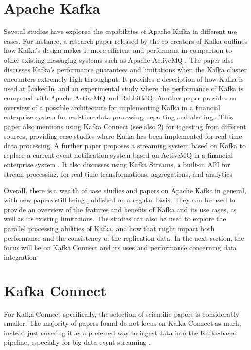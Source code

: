 \section{Apache Kafka}
Several studies have explored the capabilities of Apache Kafka in different use cases. For instance, a research paper released by the co-creators of Kafka outlines how Kafka's design makes it more efficient and performant in comparison to other existing messaging systems such as Apache ActiveMQ \cite{kreps2011kafka}. The paper also discusses Kafka's performance guarantees and limitations when the Kafka cluster encounters extremely high throughput. It provides a description of how Kafka is used at LinkedIn, and an experimental study where the performance of Kafka is compared with Apache ActiveMQ and RabbitMQ. Another paper provides an overview of a possible architecture for implementing Kafka in a financial enterprise system for real-time data processing, reporting and alerting \cite{peddireddystreamliningprocessingkafka}. This paper also mentions using Kafka Connect (see also \ref{ch03:litreview:kafkaconnect}) for ingesting from different sources, providing case studies where Kafka has been implemented for real-time data processing. A further paper proposes a streaming system based on Kafka to replace a current event notification system based on ActiveMQ in a financial enterprise system \cite{sanjanaenterprise}. It also discusses using Kafka Streams, a built-in API for stream processing, for real-time transformations, aggregations, and analytics.

Overall, there is a wealth of case studies and papers on Apache Kafka in general, with new papers still being published on a regular basis. They can be used to provide an overview of the features and benefits of Kafka and its use cases, as well as its existing limitations. The studies can also be used to explore the parallel processing abilities of Kafka, and how that might impact both performance and the consistency of the replication data. In the next section, the focus will be on Kafka Connect and its uses and performance concerning data integration.

\section{Kafka Connect}
\label{ch03:litreview:kafkaconnect}
For Kafka Connect specifically, the selection of scientific papers is considerably smaller. The majority of papers found do not focus on Kafka Connect as much, instead just covering it as a preferred way to ingest data into the Kafka-based pipeline, especially for big data event streaming \cite{padmanabankafkabigdataeventstreaming}.

